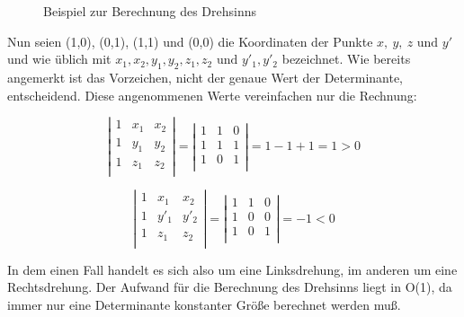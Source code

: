 \documentclass[ngerman,draft,parskip=half*,twoside]{scrreprt}
\theoremstyle{break}
\begin{document}
\begin{figure}[H]
\centering

\caption{Beispiel zur Berechnung des Drehsinns}
\label{drehsinnskizze}
\end{figure}

Nun seien (1,0), (0,1), (1,1) und (0,0) die Koordinaten der Punkte $x,\ y,\ z \mbox{ und }y'$ 
und wie üblich mit $x_1, x_2, y_1, y_2, z_1, z_2 \mbox{ und } y'_1, y'_2$
bezeichnet. Wie bereits angemerkt ist das Vorzeichen, nicht der genaue Wert der
Determinante, entscheidend. Diese angenommenen Werte vereinfachen nur die Rechnung:

\[ \left| 
\begin{array}{ccc}
1 & x_1 & x_2\\
1 & y_1 & y_2\\
1 & z_1 & z_2\\
\end{array} 
\right|=
\left| 
\begin{array}{ccc}
1 & 1 & 0\\
1 & 1 & 1\\
1 & 0 & 1\\
\end{array} 
\right|=1-1+1=1>0 \]

\[ \left| 
\begin{array}{ccc}
1 & x_1 & x_2\\
1 & y'_1 & y'_2\\
1 & z_1 & z_2\\
\end{array} 
\right|=
\left| 
\begin{array}{ccc}
1 & 1 & 0\\
1 & 0 & 0\\
1 & 0 & 1\\
\end{array} 
\right|=-1<0 \]

In dem einen Fall handelt es sich also um eine Linksdrehung, im anderen um eine Rechtsdrehung. Der Aufwand für die Berechnung des
Drehsinns liegt in O(1), da immer nur eine Determinante konstanter Größe berechnet werden muß.
\end{document}

